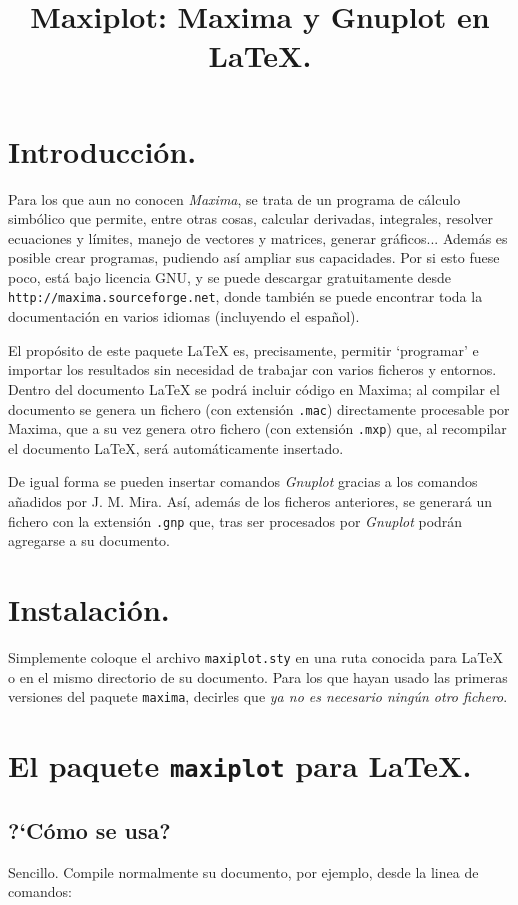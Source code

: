\documentclass[11pt,a4paper]{article}
\title{Maxiplot: Maxima y Gnuplot en \LaTeX.\\}
\def\Maxima{\emph{Maxima}}
\def\Gnuplot{\emph{Gnuplot}}
\begin{document}
\maketitle

\section{Introducci\'on.}
Para los que aun no conocen \Maxima, se trata de un programa de c\'alculo simb\'olico que 
permite, entre otras cosas, calcular derivadas, integrales, resolver ecuaciones y
l\'imites, manejo de vectores y matrices, generar gr\'aficos... Adem\'as es posible 
crear programas, pudiendo as\'i ampliar sus capacidades. Por si esto fuese poco, 
est\'a bajo licencia GNU, y se puede descargar gratuitamente desde 
\texttt{http://maxima.sourceforge.net}, donde tambi\'en se puede encontrar toda la 
documentaci\'on en varios idiomas (incluyendo el espa\~nol).

El prop\'osito de este paquete \LaTeX{} es, precisamente, permitir `programar' e importar
los resultados sin necesidad de trabajar con varios ficheros y entornos. Dentro 
del documento \LaTeX{} se podr\'a incluir c\'odigo en Maxima; al compilar el documento
se genera un fichero (con extensi\'on \texttt{.mac}) directamente procesable por Maxima,
que a su vez genera otro fichero (con extensi\'on \texttt{.mxp}) que, al recompilar el 
documento \LaTeX{}, ser\'a autom\'aticamente insertado.

De igual forma se pueden insertar comandos \Gnuplot{} gracias a los comandos a\~nadidos por J. M. Mira. As\'i, adem\'as de los ficheros anteriores, se generar\'a un fichero con la extensi\'on \texttt{.gnp} que, tras ser procesados por \Gnuplot{}
podr\'an agregarse a su documento.

\section{Instalaci\'on.}
Simplemente coloque el archivo \texttt{maxiplot.sty} en una ruta conocida para \LaTeX{} o en el mismo
directorio de su documento. Para los que hayan usado las primeras versiones del paquete \texttt{maxima}, decirles
que \emph{ya no es necesario ning\'un otro fichero}.

\section{El paquete \texttt{maxiplot} para \LaTeX{}.}

\subsection{?`C\'omo se usa?}
Sencillo. Compile normalmente su documento, por ejemplo, desde la linea de comandos:
\end{document}
